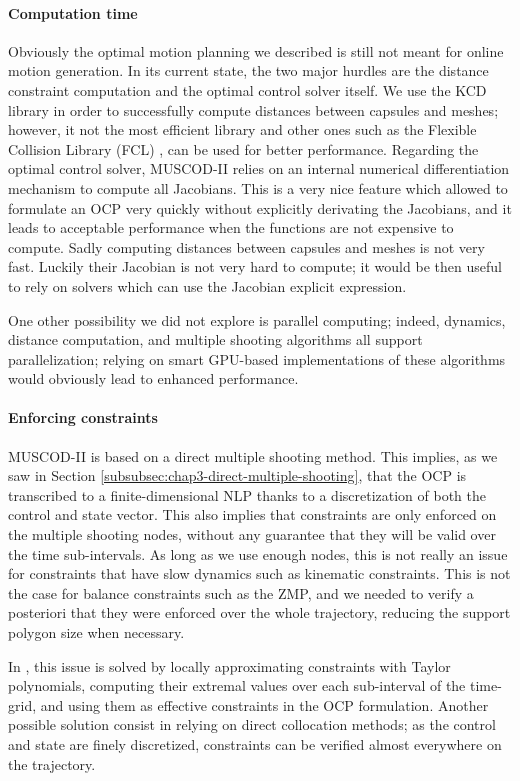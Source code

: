 \paragraph{Computation time}
Obviously the optimal motion planning we described is still not meant
for online motion generation. In its current state, the two major
hurdles are the distance constraint computation and the optimal
control solver itself. We use the KCD library in order to successfully
compute distances between capsules and meshes; however, it not the
most efficient library and other ones such as the Flexible Collision
Library (FCL) \cite{pan2012fcl}, can be used for better
performance. Regarding the optimal control solver, \textsc{MUSCOD-II}
relies on an internal numerical differentiation mechanism to compute
all Jacobians. This is a very nice feature which allowed to formulate
an OCP very quickly without explicitly derivating the Jacobians, and
it leads to acceptable performance when the functions are not
expensive to compute. Sadly computing distances between capsules and
meshes is not very fast. Luckily their Jacobian is not very hard to
compute; it would be then useful to rely on solvers which can use the
Jacobian explicit expression.

One other possibility we did not explore is parallel computing;
indeed, dynamics, distance computation, and multiple shooting
algorithms all support parallelization; relying on smart GPU-based
implementations of these algorithms would obviously lead to enhanced
performance.

\paragraph{Enforcing constraints}
\textsc{MUSCOD-II} is based on a direct multiple shooting method. This
implies, as we saw in Section
\ref{subsubsec:chap3-direct-multiple-shooting}, that the OCP is
transcribed to a finite-dimensional NLP thanks to a discretization of
both the control and state vector. This also implies that constraints
are only enforced on the multiple shooting nodes, without any
guarantee that they will be valid over the time sub-intervals. As long
as we use enough nodes, this is not really an issue for constraints
that have slow dynamics such as kinematic constraints. This is not the
case for balance constraints such as the ZMP, and we needed to verify
a posteriori that they were enforced over the whole trajectory,
reducing the support polygon size when necessary.

In \cite{Lengagne2010}, this issue is solved by locally approximating
constraints with Taylor polynomials, computing their extremal values
over each sub-interval of the time-grid, and using them as effective
constraints in the OCP formulation. Another possible solution consist
in relying on direct collocation methods; as the control and state are
finely discretized, constraints can be verified almost everywhere on
the trajectory.

